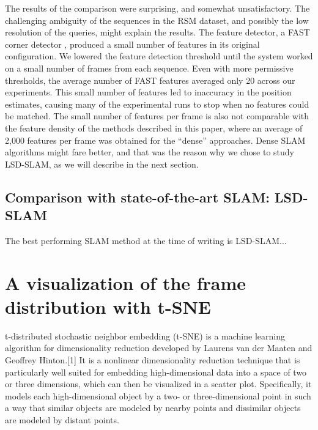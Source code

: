 The results of the comparison were surprising, and somewhat unsatisfactory. The challenging ambiguity of the sequences in the RSM dataset, and possibly the low resolution of the queries, might explain the results. The feature detector, a FAST corner detector \citep{rosten_2006_machine}, produced a small number of features in its original  configuration. We lowered the feature detection threshold until the system worked on a small number of frames from each sequence. Even with more permissive thresholds, the average number of FAST features averaged only 20 across our experiments. This small number of features led to inaccuracy in the position estimates, causing many of the experimental runs to stop when no features could be matched. The small number of features per frame is also not comparable with the feature density of the methods described in this paper, where an average of 2,000 features per frame was obtained for the ``dense'' approaches. Dense SLAM algorithms might fare better, and that was the reason why we chose to study LSD-SLAM, as we will describe in the next section.

\subsection{Comparison with state-of-the-art SLAM: LSD-SLAM}


The best performing SLAM method at the time of writing is LSD-SLAM... 


\section{A visualization of the frame distribution with t-SNE}


t-distributed stochastic neighbor embedding (t-SNE) is a machine learning algorithm for dimensionality reduction developed by Laurens van der Maaten and Geoffrey Hinton.[1] It is a nonlinear dimensionality reduction technique that is particularly well suited for embedding high-dimensional data into a space of two or three dimensions, which can then be visualized in a scatter plot. Specifically, it models each high-dimensional object by a two- or three-dimensional point in such a way that similar objects are modeled by nearby points and dissimilar objects are modeled by distant points.

